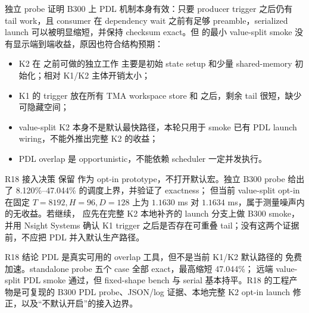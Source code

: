独立 probe 证明 B300 上 PDL 机制本身有效：只要 producer trigger 之后仍有
tail work，且 consumer 在 dependency wait 之前有足够 preamble，serialized
launch 可以被明显缩短，并保持 checksum exact。但 \FlashKDA{} 的最小
value-split smoke 没有显示端到端收益，原因也符合结构预期：

\begin{itemize}
  \item K2 在  之前可做的独立工作
        主要是初始 state setup 和少量 shared-memory 初始化；相对 K1/K2
        主体开销太小；
  \item K1 的 trigger 放在所有 TMA workspace store 和
         之后，剩余 tail 很短，缺少可隐藏空间；
  \item value-split K2 本身不是默认最快路径，本轮只用于 smoke 已有
        PDL launch wiring，不能外推出完整 K2 的收益；
  \item PDL overlap 是 opportunistic，不能依赖 scheduler 一定并发执行。
\end{itemize}

\begin{decision}{R18 接入决策}
保留  作为 opt-in prototype，不打开默认宏。独立
B300 probe 给出了 8.120\%--47.044\% 的调度上界，并验证了 exactness；
但当前 \FlashKDA{} value-split opt-in 在固定 \(T=8192,H=96,D=128\)
上为 \(1.1630\) ms 对 \(1.1634\) ms，属于测量噪声内的无收益。若继续，
应先在完整 K2 本地补齐的 launch 分支上做 B300 smoke，并用 Nsight Systems
确认 K1 trigger 之后是否存在可重叠 tail；没有这两个证据前，不应把 PDL
并入默认生产路径。
\end{decision}

\begin{record}{R18 结论}
PDL 是真实可用的 overlap 工具，但不是当前 \FlashKDA{} K1/K2 默认路径的
免费加速。standalone probe 五个 case 全部 exact，最高缩短 47.044\%；
远端 value-split \FlashKDA{} PDL smoke 通过，但 fixed-shape bench 与
serial 基本持平。R18 的工程产物是可复现的 B300 PDL probe、JSON/log
证据、本地完整 K2 opt-in launch 修正，以及“不默认开启”的接入边界。
\end{record}
